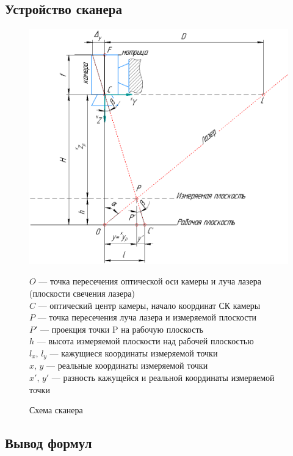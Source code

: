\documentclass[a4paper, 12pt]{article}
\begin{document}
    \subsection{Устройство сканера}
    \begin{figure}[h!]
        \begin{center}
            \includegraphics[width=0.75\linewidth]{main-scheme.png}
            \caption{Схема сканера}
        \end{center}
        
        $O$ --- точка пересечения оптической оси камеры и луча лазера (плоскости свечения лазера)\\
        $C$ --- оптический центр камеры, начало координат СК камеры\\
        $P$ --- точка пересечения луча лазера и измеряемой плоскости\\
        $P'$ --- проекция точки P на рабочую плоскость\\
        $h$ --- высота измеряемой плоскости над рабочей плоскостью\\
        $l_x,\,l_y$ --- кажущиеся координаты измеряемой точки\\
        $x,\,y$ --- реальные координаты измеряемой точки\\
        $x',\,y'$ --- разность кажущейся и реальной координаты измеряемой точки\\
    \end{figure}

    \subsection{Вывод формул}\label{subsec:вывод_формул}
\end{document}
